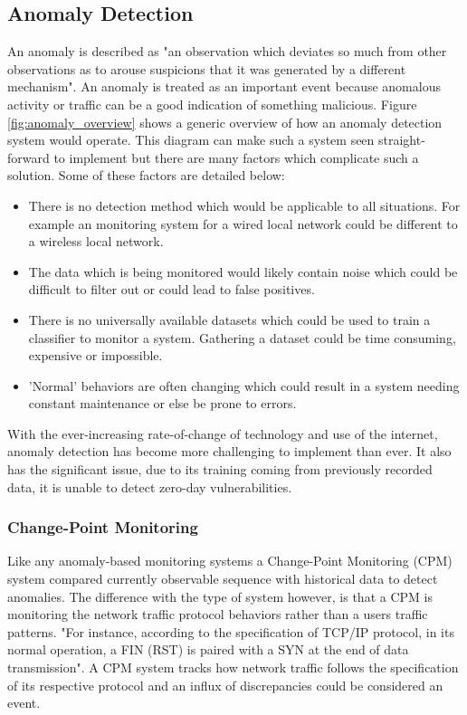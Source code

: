 \documentclass[conference, a4paper]{IEEEtran}
\begin{document}
    \subsection{Anomaly Detection}
        An anomaly is described as  "an observation which deviates so much from other observations as to arouse suspicions that it was generated by a different mechanism". \cite{hawkins_quote}
        An anomaly is treated as an important event because anomalous activity or traffic can be a good indication of something malicious. 
        Figure \ref{fig:anomaly_overview} shows a generic overview of how an anomaly detection system would operate.
        This diagram can make such a system seen straight-forward to implement but there are many factors which complicate such a solution.
        Some of these factors are detailed below: \\
            \begin{itemize}
                \item There is no detection method which would be applicable to all situations. For example an monitoring system for a wired local network could be different to a wireless local network.
                \item The data which is being monitored would likely contain noise which could be difficult to filter out or could lead to false positives.
                \item There is no universally available datasets which could be used to train a classifier to monitor a system. Gathering a dataset could be time consuming, expensive or impossible.
                \item 'Normal' behaviors are often changing which could result in a system needing constant maintenance or else be prone to errors.\\
            \end{itemize}
        With the ever-increasing rate-of-change of technology and use of the internet, anomaly detection has become more challenging to implement than ever.
        It also has the significant issue, due to its training coming from previously recorded data, it is unable to detect zero-day vulnerabilities.\cite{anomaly_survey}
        
        \subsubsection{Change-Point Monitoring}
            Like any anomaly-based monitoring systems a Change-Point Monitoring (CPM) system compared currently observable sequence with historical data to detect anomalies.
            The difference with the type of system however, is that a CPM is monitoring the network traffic protocol behaviors rather than a users traffic patterns. 
            "For instance, according to the specification of TCP/IP protocol, in its normal operation, a FIN (RST) is paired with a SYN at the end of data transmission".
            A CPM system tracks how network traffic follows the specification of its respective protocol and an influx of discrepancies could be considered an event. \cite{CPM}
\end{document}
